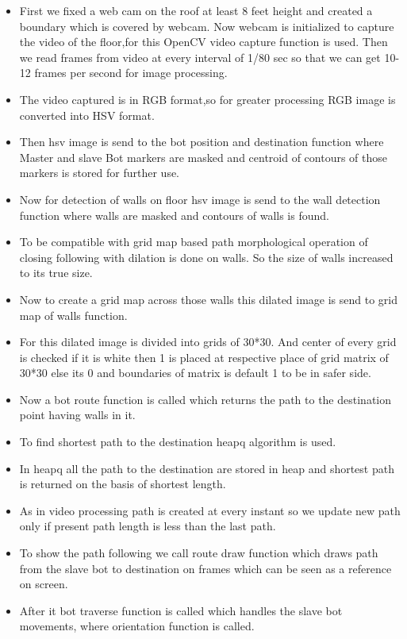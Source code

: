 \documentclass[report]{res}
\begin{document}
	\begin{itemize}
	\item First we fixed a web cam on the roof at least 8 feet height and created a boundary which is covered by webcam. Now webcam is initialized to capture the video of the floor,for this OpenCV video capture function is used. Then we read frames from video at every interval of 1/80 sec so that we can get 10-12 frames per second for image processing. 
	\item The video captured is in RGB format,so for greater processing RGB image is converted into HSV format.
	\item Then hsv image is send to the bot position and destination function where Master and slave Bot markers are masked and centroid of contours of those markers is stored for further use. 
	\item Now for detection of walls on floor hsv image is send to the wall detection function where walls are masked and contours of walls is found. 
	\item To be compatible with grid map based path morphological operation of closing following with dilation is done on walls. So the size of walls increased to its true size. 
	\item Now to create a grid map across those walls this dilated image is send to grid map of walls function. 
	\item For this dilated image is divided into grids of 30*30. And center of every grid is checked if it is white then 1 is placed at respective place of grid matrix of 30*30 else its 0 and boundaries of matrix is default 1 to be in safer side. 
	\item Now a bot route function is called which returns the path to the destination point having walls in it. 
	\item To find shortest path to the destination heapq algorithm is used. 
	\item In heapq all the path to the destination are stored in heap and shortest path is returned on the basis of shortest length. 
	\item As in video processing path is created at every instant so we update new path only if present path length is less than the last path. 
	\item To show the path following we call route draw function which draws path from the slave bot to destination on frames which can be seen as a reference on screen. 
	\item After it bot traverse function is called which handles the slave bot movements, where orientation function is called. 

\end{itemize}
\end{document}
